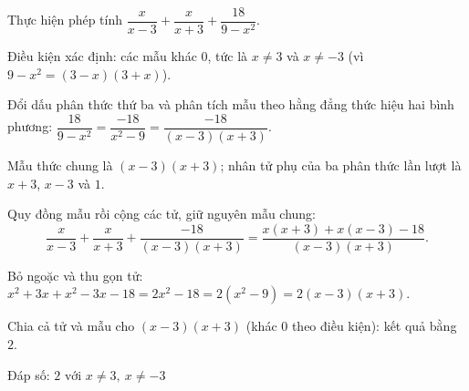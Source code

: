 \begin{problem}[8DS-PS-039]
Thực hiện phép tính $\dfrac{x}{x - 3} + \dfrac{x}{x + 3} + \dfrac{18}{9 - x^2}$.

\begin{solution}
Điều kiện xác định: các mẫu khác $0$, tức là $x \neq 3$ và $x \neq -3$ (vì $9 - x^2 = (3 - x)(3 + x)$).

Đổi dấu phân thức thứ ba và phân tích mẫu theo hằng đẳng thức hiệu hai bình phương: $\dfrac{18}{9 - x^2} = \dfrac{-18}{x^2 - 9} = \dfrac{-18}{(x - 3)(x + 3)}$.

Mẫu thức chung là $(x - 3)(x + 3)$; nhân tử phụ của ba phân thức lần lượt là $x + 3$, $x - 3$ và $1$.

Quy đồng mẫu rồi cộng các tử, giữ nguyên mẫu chung:
\[ \dfrac{x}{x - 3} + \dfrac{x}{x + 3} + \dfrac{-18}{(x - 3)(x + 3)} = \dfrac{x(x + 3) + x(x - 3) - 18}{(x - 3)(x + 3)}. \]

Bỏ ngoặc và thu gọn tử: $x^2 + 3x + x^2 - 3x - 18 = 2x^2 - 18 = 2(x^2 - 9) = 2(x - 3)(x + 3)$.

Chia cả tử và mẫu cho $(x - 3)(x + 3)$ (khác $0$ theo điều kiện): kết quả bằng $2$.

Đáp số: $\boxed{2 \text{ với } x \neq 3,\ x \neq -3}$
\end{solution}
\end{problem}

